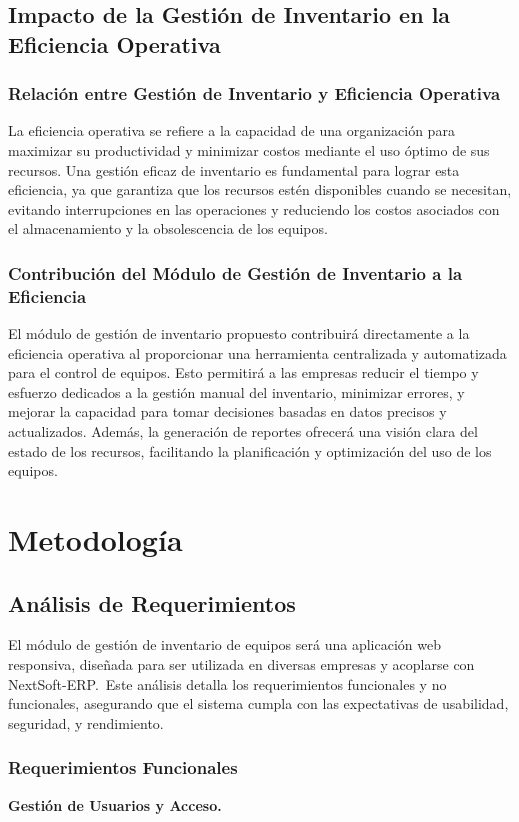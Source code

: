 \documentclass[stu, 12pt, letterpaper, donotrepeattitle, floatsintext, natbib]{apa7}
\begin{document}
\subsection{Impacto de la Gestión de Inventario en la Eficiencia Operativa}
\subsubsection{Relación entre Gestión de Inventario y Eficiencia Operativa}
La eficiencia operativa se refiere a la capacidad de una organización para maximizar su productividad y minimizar costos mediante el uso óptimo
de sus recursos. Una gestión eficaz de inventario es fundamental para lograr esta eficiencia, ya que garantiza que los recursos estén
disponibles cuando se necesitan, evitando interrupciones en las operaciones y reduciendo los costos asociados con el almacenamiento y la
obsolescencia de los equipos.
\subsubsection{Contribución del Módulo de Gestión de Inventario a la Eficiencia}
El módulo de gestión de inventario propuesto contribuirá directamente a la eficiencia operativa al proporcionar una herramienta centralizada
y automatizada para el control de equipos. Esto permitirá a las empresas reducir el tiempo y esfuerzo dedicados a la gestión manual del
inventario, minimizar errores, y mejorar la capacidad para tomar decisiones basadas en datos precisos y actualizados. Además, la generación de
reportes ofrecerá una visión clara del estado de los recursos, facilitando la planificación y optimización del uso de los equipos.
\newpage
\section{Metodología}
\subsection{Análisis de Requerimientos}
El módulo de gestión de inventario de equipos será una aplicación web responsiva, diseñada para ser utilizada en diversas empresas y acoplarse
con NextSoft-ERP.~Este análisis detalla los requerimientos funcionales y no funcionales, asegurando que el sistema cumpla con las expectativas
de usabilidad, seguridad, y rendimiento.
\subsubsection{Requerimientos Funcionales}
\textbf{Gestión de Usuarios y Acceso.}
\end{document}
